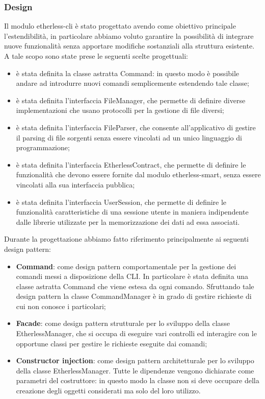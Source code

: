 \subsubsection{Design}
Il modulo etherless-cli è stato progettato avendo come obiettivo principale l'estendibilità, in particolare abbiamo voluto garantire la possibilità di integrare nuove funzionalità senza apportare modifiche sostanziali alla struttura esistente. A tale scopo sono state prese le seguenti scelte progettuali:
\begin{itemize}
	\item è stata definita la classe astratta Command: in questo modo è possibile andare ad introdurre nuovi comandi semplicemente estendendo tale classe;
	\item è stata definita l'interfaccia FileManager, che permette di definire diverse implementazioni che usano protocolli per la gestione di file diversi;
	\item è stata definita l'interfaccia FileParser, che consente all'applicativo di gestire il parsing di file sorgenti senza essere vincolati ad un unico linguaggio di programmazione;
	\item è stata definita l'interfaccia EtherlessContract, che permette di definire le funzionalità che devono essere fornite dal modulo etherless-smart, senza essere vincolati alla sua interfaccia pubblica;
	\item è stata definita l'interfaccia UserSession, che permette di definire le funzionalità caratteristiche di una sessione utente in maniera indipendente dalle librerie utilizzate per la memorizzazione dei dati ad essa associati.
\end{itemize}

Durante la progettazione abbiamo fatto riferimento principalmente ai seguenti design pattern:
\begin{itemize}
	\item \textbf{Command}: come design pattern comportamentale per la gestione dei comandi messi a disposizione della CLI. In particolare è stata definita una classe astratta Command che viene estesa da ogni comando. Sfruttando tale design pattern la classe CommandManager è in grado di gestire richieste di cui non conosce i particolari;

	\item \textbf{Facade}: come design pattern strutturale per lo sviluppo della classe EtherlessManager, che si occupa di eseguire vari controlli ed interagire con le opportune classi per gestire le richieste eseguite dai comandi;

	\item \textbf{Constructor injection}: come design pattern architetturale per lo sviluppo della classe EtherlessManager. Tutte le dipendenze vengono dichiarate come parametri del costruttore: in questo modo la classe non si deve occupare della creazione degli oggetti considerati ma solo del loro utilizzo.
\end{itemize}


